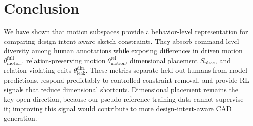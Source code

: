 \section{Conclusion}
\label{sec:conclusion}

We have shown that motion subspaces provide a behavior-level representation for comparing design-intent-aware sketch constraints. They absorb command-level diversity among human annotations while exposing differences in driven motion $\theta_\mathrm{motion}^\mathrm{full}$, relation-preserving motion $\theta_\mathrm{motion}^\mathrm{rel}$, dimensional placement $S_\mathrm{place}$, and relation-violating edits $\theta_\mathrm{leak}^\mathrm{dim}$. These metrics separate held-out humans from model predictions, respond predictably to controlled constraint removal, and provide RL signals that reduce dimensional shortcuts. Dimensional placement remains the key open direction, because our pseudo-reference training data cannot supervise it; improving this signal would contribute to more design-intent-aware CAD generation.